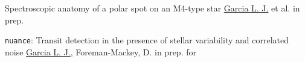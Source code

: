     {Spectroscopic anatomy of a polar spot on an M4-type star}
    {\underline{Garcia L. J.} et al.}
    {in prep.}

    {\texttt{nuance}: Transit detection in the presence of stellar variability and correlated noise}
    {\underline{Garcia L. J.}, Foreman-Mackey, D.}
    {in prep. for \aap}